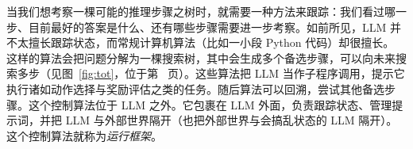 当我们想考察一棵可能的推理步骤之树时，就需要一种方法来跟踪：我们看过哪一步、目前最好的答案是什么、还有哪些步骤需要进一步考察。如前所见，LLM 并不太擅长跟踪状态，而常规计算机算法（比如一小段 Python 代码）却很擅长。
%
%
这样的算法会把问题分解为一棵搜索树，其中会生成多个备选步骤，可以向未来搜索多步（见图~\ref{fig:tot}，位于第~\pageref{fig:tot} 页）。这些算法把 LLM 当作子程序调用，提示它执行诸如动作选择与奖励评估之类的任务。随后算法可以回溯，尝试其他备选步骤。这个控制算法位于 LLM 之外。它包裹在 LLM 外面，负责跟踪状态、管理提示词，并把 LLM 与外部世界隔开（也把外部世界与会搞乱状态的 LLM 隔开）。这个控制算法就称为{\em 运行框架}。
%


